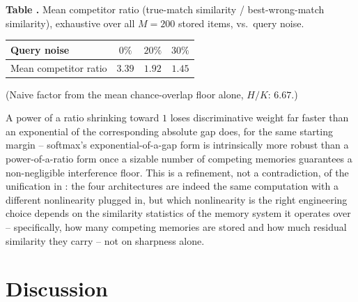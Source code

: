 \documentclass[11pt]{article}
\newcommand{\toprule}{\hline\hline}
\newcommand{\midrule}{\hline}
\newcommand{\bottomrule}{\hline\hline}
\begin{document}
\label{tab:ratio}
\noindent\textbf{Table \thetable.} Mean competitor ratio (true-match similarity / best-wrong-match
similarity), exhaustive over all $M{=}200$ stored items, vs.\ query noise.
\begin{center}
\begin{tabular}{lccc}
\toprule
Query noise & $0\%$ & $20\%$ & $30\%$ \\
\midrule
Mean competitor ratio & $3.39$ & $1.92$ & $1.45$ \\
\bottomrule
\end{tabular}
\end{center}
\noindent(Naive factor from the mean chance-overlap floor alone, $H/K$: $6.67$.)

A power of a ratio shrinking toward $1$ loses discriminative weight far faster than an
exponential of the corresponding absolute gap does, for the same starting margin --
softmax's exponential-of-a-gap form is intrinsically more robust than a power-of-a-ratio form
once a sizable number of competing memories guarantees a non-negligible interference floor.
This is a refinement, not a contradiction, of the unification in \cite{gershman2025}: the four
architectures are indeed the same computation with a different nonlinearity plugged in, but
which nonlinearity is the right engineering choice depends on the similarity statistics of the
memory system it operates over -- specifically, how many competing memories are stored and how
much residual similarity they carry -- not on sharpness alone.

\section{Discussion}
\end{document}
